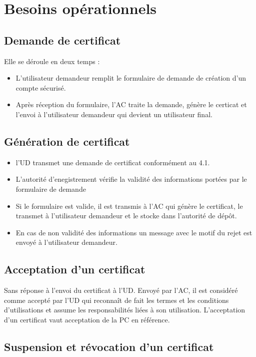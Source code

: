 \documentclass[a4paper,11pt,french]{article}
\begin{document}
\section{Besoins opérationnels}

\subsection{Demande de certificat}

Elle se déroule en deux temps :
\begin{itemize}
\item L'utilisateur demandeur remplit le formulaire de demande de création d'un compte sécurisé.
\item Après réception du formulaire, l'AC traite la demande, génère le certicat et l'envoi à l'utilisateur demandeur qui devient un utilisateur final.
 \end{itemize}
 
\subsection{Génération de certificat}
\begin{itemize}
\item l'UD transmet une demande de certificat conformément au 4.1. \item L'autorité d'enegistrement vérifie la validité des informations portées par le formulaire de demande
\item Si le formulaire est valide, il est transmis à l'AC qui génère le certificat, le transmet à l'utilisateur demandeur et le stocke dans l'autorité de dépôt.
\item En cas de non validité des informations un message avec le motif du rejet est envoyé à l'utilisateur demandeur.

\end{itemize}

\subsection{Acceptation d'un certificat}
Sans réponse à l'envoi du certificat à l'UD. Envoyé par l'AC, il est considéré comme accepté par l'UD qui reconnaît de fait les termes et les conditions d'utilisations et assume les responsabilités liées à son utilisation. L'acceptation d'un certificat vaut acceptation de la PC en référence.

\subsection{Suspension et révocation d'un certificat}
\end{document}
